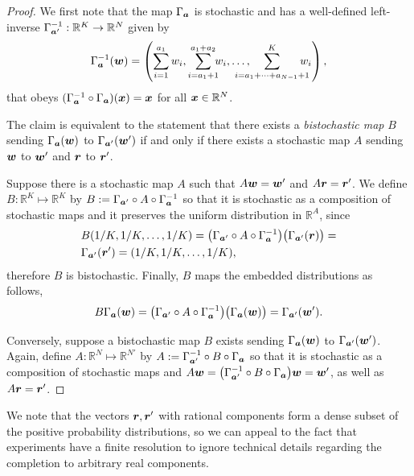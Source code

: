\documentclass[pra,
aps,
twocolumn,
superscriptaddress,
groupedaddress,
nofootinbib,
reprint
]{revtex4-1}
\begin{document}
\begin{proof}
	We first note that the map $\Gamma_{\bm{a}}$ is stochastic and has a well-defined left-inverse $\Gamma^{-1}_{\bm{a}'}: \mathbb{R}^K \rightarrow \mathbb{R}^N$ given by
\begin{equation}
	\Gamma^{-1}_{\bma}(\w) = \left( \sum_{i=1}^{a_1} w_i,  \sum_{i = a_1 +1}^{a_1 + a_2} \hspace{-5pt} w_i, \dots , \hspace{-15pt} \sum_{i=a_1 + \dots + a_{N-1}+1}^{K} \hspace{-10pt} w_i \right),
\end{equation}
that obeys $(\Gamma^{-1}_{\bm{a}} \circ \Gamma_{\bm{a}}) (\boldsymbol{x}) = \boldsymbol{x}$ for all $\boldsymbol{x} \in \mathbb{R}^N$. 

The claim is equivalent to the statement that there exists a \emph{bistochastic map} $B$ sending $\Gamma_{\bm{a}}(\boldsymbol{w})$ to $\Gamma_{\bm{a}'}(\boldsymbol{w}')$ if and only if there exists a stochastic map $A$ sending $\boldsymbol{w}$ to $\boldsymbol{w}'$ and $\boldsymbol{r}$ to $\boldsymbol{r}'$.

Suppose there is a stochastic map $A$ such that $A\boldsymbol{w}=\boldsymbol{w}'$ and $A\boldsymbol{r} = \boldsymbol{r}'$. 
We define $B:\mathbb{R}^K \mapsto \mathbb{R}^K$ by $B := \Gamma_{\bm{a}'} \circ A \circ \Gamma_{\bm{a}}^{-1}$ so that it is stochastic as a composition of stochastic maps and it preserves the uniform distribution in $\mathbb{R}^A$, since
\begin{align}
	&B(1/K, 1/K, \dots, 1/K) = \big( \Gamma_{\bm{a}'} \circ A \circ \Gamma_{\bm{a}}^{-1} \big) \big( \Gamma_{\bm{a}'}(\boldsymbol{r}) \big) = \nonumber\\
	&\Gamma_{\bm{a}'} (\boldsymbol{r}') = (1/K, 1/K, \dots, 1/K),
\end{align}
therefore $B$ is bistochastic.
Finally, $B$ maps the embedded distributions as follows,
\begin{equation}
	B \Gamma_{\bm{a}}(\boldsymbol{w}) = \big( \Gamma_{\bm{a}'} \circ A \circ \Gamma_{\bm{a}}^{-1} \big) \big( \Gamma_{\bm{a}}(\boldsymbol{w}) \big) = \Gamma_{\bm{a}'} (\boldsymbol{w}').
\end{equation}

Conversely, suppose a bistochastic map $B$ exists sending $\Gamma_{\bm{a}}(\boldsymbol{w})$ to $\Gamma_{\bm{a}'}(\boldsymbol{w}')$. Again, define $A: \mathbb{R}^N \mapsto \mathbb{R}^{N'}$ by $A := \Gamma_{\bm{a}'}^{-1} \circ B \circ \Gamma_{\bm{a}}$ so that it is stochastic as a composition of stochastic maps and $A \boldsymbol{w} = \big( \Gamma_{\bm{a}'}^{-1} \circ B \circ \Gamma_{\bm{a}} \big) \boldsymbol{w} = \boldsymbol{w}'$, as well as $A \boldsymbol{r} = \boldsymbol{r}'$.
\end{proof}
We note that the vectors $\boldsymbol{r}, \boldsymbol{r}'$ with rational components form a dense subset of the positive probability distributions, so we can appeal to the fact that experiments have a finite resolution to ignore technical details regarding the completion to arbitrary real components.
\end{document}
